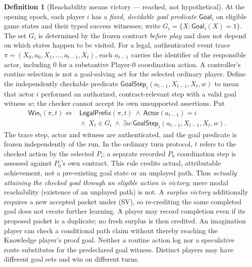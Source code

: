 \documentclass[11pt,letterpaper]{article}
\theoremstyle{definition}
\newtheorem{definition}{Definition}[section]
\theoremstyle{plain}
\theoremstyle{definition}
\begin{document}
\begin{definition}[Reachability means victory --- reached, not hypothetical]
At the opening epoch, each player $i$ has a \emph{fixed, decidable goal predicate} $\mathsf{Goal}_i$ on eligible game states and their typed success witnesses; write $G_i=\{X:\mathsf{Goal}_i(X)=1\}$. The set $G_i$ is determined by the frozen contract \emph{before play} and does not depend on which states happen to be visited. For a legal, authenticated event trace $\pi=(X_0,a_0,X_1,\ldots,a_{t-1},X_t)$, each $a_{t-1}$ carries the identifier of the responsible actor, including $0$ for a substantive Player-0 coordination action. A controller's routine selection is not a goal-solving act for the selected ordinary player. Define the independently checkable predicate $\mathsf{GoalStep}_i(a_{t-1},X_{t-1},X_t,w)$ to mean that actor $i$ performed an authorized, contract-relevant step with a valid goal witness $w$; the checker cannot accept its own unsupported assertions. Put
\begin{equation}\tag{RV}\label{eq:rv}
\begin{aligned}
 \mathsf{Win}_i(\pi,t)\iff{}&\mathsf{LegalPrefix}(\pi,t)\ \land\ \mathsf{Actor}(a_{t-1})=i\\[-1pt]
 &{}\land\ X_t\in G_i\ \land\ \exists w\,\mathsf{GoalStep}_i(a_{t-1},X_{t-1},X_t,w).
\end{aligned}
\end{equation}
The trace step, actor and witness are authenticated, and the goal predicate is frozen independently of the run. In the ordinary turn protocol, $t$ refers to the checked action by the selected $P_i$; a separate recorded $P_0$ coordination step is assessed against $P_0$'s own contract. This rule credits actual, attributable achievement, not a pre-existing goal state or an unplayed path. Thus \emph{actually attaining the checked goal through an eligible action is victory}; mere modal reachability (existence of an unplayed path) is not. A \emph{surplus victory} additionally requires a new accepted packet under (SV), so re-crediting the same completed goal does not create further learning. A player may record completion even if its proposed packet is a duplicate; no fresh surplus is then credited. An imagination player can check a conditional path claim without thereby reaching the Knowledge player's proof goal. Neither a routine action log nor a speculative route substitutes for the predeclared goal witness. Distinct players may have different goal sets and win on different turns.
\end{definition}
\end{document}
